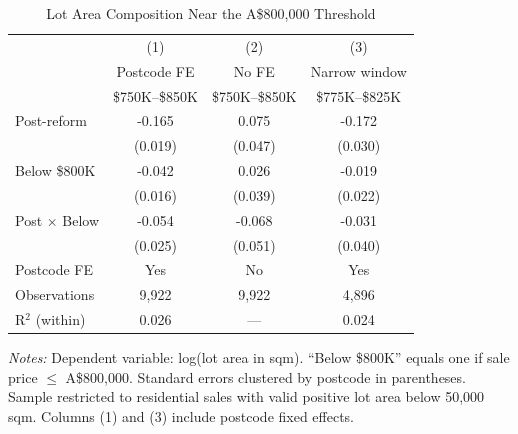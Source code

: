 \begin{table}[t]
\centering
\caption{Lot Area Composition Near the A\$800,000 Threshold}
\label{tab:composition}
\begin{tabular}{lccc}
\hline\hline
& (1) & (2) & (3) \\
& Postcode FE & No FE & Narrow window \\
& \$750K--\$850K & \$750K--\$850K & \$775K--\$825K \\
\hline
Post-reform & -0.165 & 0.075 & -0.172 \\
 & (0.019) & (0.047) & (0.030) \\
[3pt]
Below \$800K & -0.042 & 0.026 & -0.019 \\
 & (0.016) & (0.039) & (0.022) \\
[3pt]
Post $\times$ Below & -0.054 & -0.068 & -0.031 \\
 & (0.025) & (0.051) & (0.040) \\
[6pt]
Postcode FE & Yes & No & Yes \\
Observations & 9,922 & 9,922 & 4,896 \\
R$^2$ (within) & 0.026 & --- & 0.024 \\
\hline\hline
\end{tabular}
\begin{tablenotes}[flushleft]\small
\item \textit{Notes:} Dependent variable: log(lot area in sqm). ``Below \$800K'' equals one if sale price $\leq$ A\$800,000. Standard errors clustered by postcode in parentheses. Sample restricted to residential sales with valid positive lot area below 50,000 sqm. Columns (1) and (3) include postcode fixed effects.
\end{tablenotes}
\end{table}


